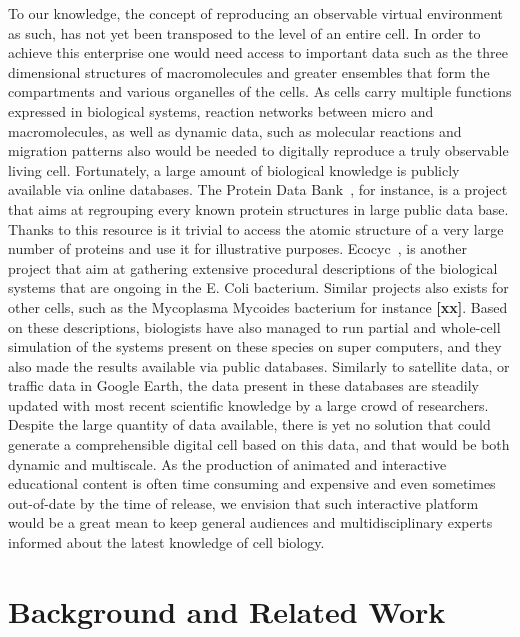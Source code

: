 To our knowledge, the concept of reproducing an observable virtual environment as such, has not yet been transposed to the level of an entire cell.
In order to achieve this enterprise one would need access to important data such as the three dimensional structures of macromolecules and greater ensembles that form the compartments and various organelles of the cells.
As cells carry multiple functions expressed in biological systems, reaction networks between micro and macromolecules, as well as dynamic data, such as molecular reactions and migration patterns also would be needed to digitally reproduce a truly observable living cell.
Fortunately, a large amount of biological knowledge is publicly available via online databases.
The Protein Data Bank~\cite{bernstein1977protein}, for instance, is a project that aims at regrouping every known protein structures in large public data base.
Thanks to this resource is it trivial to access the atomic structure of a very large number of proteins and use it for illustrative purposes.
Ecocyc~\cite{keseler2005ecocyc}, is another project that aim at gathering extensive procedural descriptions of the biological systems that are ongoing in the E. Coli bacterium.
Similar projects also exists for other cells, such as the Mycoplasma Mycoides bacterium for instance\textbf{ [xx]}.
Based on these descriptions, biologists have also managed to run partial and whole-cell simulation of the systems present on these species on super computers, and they also made the results available via public databases\cite{karr2014wholecellsimdb}.
Similarly to satellite data, or traffic data in Google Earth, the data present in these databases are steadily updated with most recent scientific knowledge by a large crowd of researchers.
Despite the large quantity of data available, there is yet no solution that could generate a comprehensible digital cell based on this data, and that would be both dynamic and multiscale.
As the production of animated and interactive educational content is often time consuming and expensive and even sometimes out-of-date by the time of release, we envision that such interactive platform would be a great mean to keep general audiences and multidisciplinary experts informed about the latest knowledge of cell biology.

\section{Background and Related Work}

